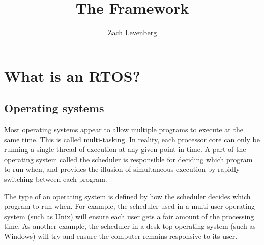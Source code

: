 \documentclass[12pt compsoc]{article}
\begin{document}
\title{The Framework}

\author{Zach Levenberg}

\maketitle


\begin{figure}[H]
\centering
\end{figure}

\begin{figure}[b!]
\centering
\end{figure}

\newpage



\newpage

\tableofcontents
\newpage


\section{What is an RTOS?}

\subsection{Operating systems}
Most operating systems appear to allow multiple programs to execute at the same time. This is called multi-tasking. In reality, each processor core can only be running a single thread of execution at any given point in time. A part of the operating system called the scheduler is responsible for deciding which program to run when, and provides the illusion of simultaneous execution by rapidly switching between each program.

The type of an operating system is defined by how the scheduler decides which program to run when. For example, the scheduler used in a multi user operating system (such as Unix) will ensure each user gets a fair amount of the processing time. As another example, the scheduler in a desk top operating system (such as Windows) will try and ensure the computer remains responsive to its user.
\end{document}
